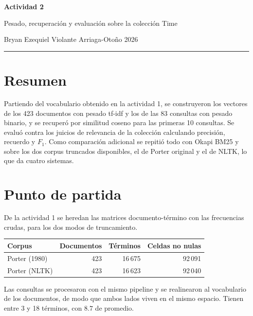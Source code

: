 \documentclass[11pt,letterpaper]{article}
\newcommand{\periodo}{Otoño 2026}
\newcommand{\alumno}{Bryan Ezequiel Violante Arriaga}
\begin{document}

\begin{center}
  {\LARGE\bfseries Actividad 2\par}
  \vspace{0.3em}
  {\large Pesado, recuperación y evaluación sobre la colección
   Time\par}
  \vspace{0.5em}
  {\small \alumno \quad-\quad \periodo\par}
  \vspace{0.4em}
  \rule{\linewidth}{0.5pt}
\end{center}

\section*{Resumen}

Partiendo del vocabulario obtenido en la actividad 1, se construyeron
los vectores de los 423 documentos con pesado tf-idf y los de las 83
consultas con pesado binario, y se recuperó por similitud coseno para
las primeras 10 consultas. Se evaluó contra los juicios de relevancia
de la colección calculando precisión, recuerdo y $F_1$. Como
comparación adicional se repitió todo con Okapi BM25 y sobre los dos
corpus truncados disponibles, el de Porter original y el de NLTK, lo
que da cuatro sistemas.

\section{Punto de partida}

De la actividad 1 se heredan las matrices documento-término con las
frecuencias crudas, para los dos modos de truncamiento.

\begin{center}
\begin{tabular}{lrrr}
    \toprule
    \textbf{Corpus} & \textbf{Documentos} & \textbf{Términos}
      & \textbf{Celdas no nulas} \\
    \midrule
    Porter (1980) & 423 & 16\,675 & 92\,091 \\
    Porter (NLTK) & 423 & 16\,623 & 92\,040 \\
    \bottomrule
\end{tabular}
\end{center}

Las consultas se procesaron con el mismo pipeline y se realinearon al
vocabulario de los documentos, de modo que ambos lados viven en el
mismo espacio. Tienen entre 3 y 18 términos, con $8.7$ de promedio.
\end{document}
